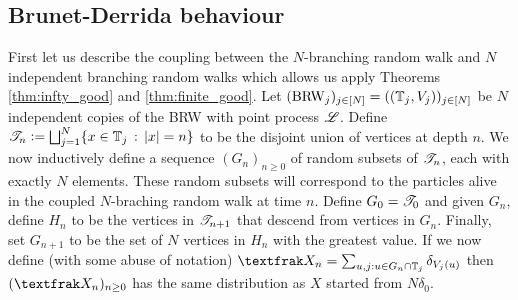 




\subsection{Brunet-Derrida behaviour}\label{sec:ExpTails_BrunDer}
First let us describe the coupling between the $N$-branching random walk and $N$ independent branching random walks which allows us apply Theorems \ref{thm:infty_good} and \ref{thm:finite_good}. Let $(\text{BRW}_j)_{j \in [N]} = ((\mathbb{T}_j, V_j))_{j \in [N]}$ be $N$ independent copies of the BRW with point process $\mathscr{L}$. Define $\mathscr{T}_n \vcentcolon= \bigsqcup_{j=1}^N \{ x \in \mathbb{T}_j \,:\, |x|=n \}$ to be the disjoint union of vertices at depth $n$. We now inductively define a sequence $(G_n)_{n \geq 0}$ of random subsets of $\mathscr{T}_n$, each with exactly $N$ elements. These random subsets will correspond to the particles alive in the coupled $N$-braching random walk at time $n$. Define $G_0 = \mathscr{T}_0$ and given $G_n$, define $H_n$ to be the vertices in $\mathscr{T}_{n+1}$ that descend from vertices in $G_n$. Finally, set $G_{n+1}$ to be the set of $N$ vertices in $H_n$ with the greatest value. If we now define (with some abuse of notation) $\frak{X}_n = \sum_{u,j : u \in G_n \cap \bb{T}_j} \delta_{V_j(u)}$ then $(\frak{X}_n)_{n \geq 0}$ has the same distribution as $X$ started from $N \delta_0$. 

